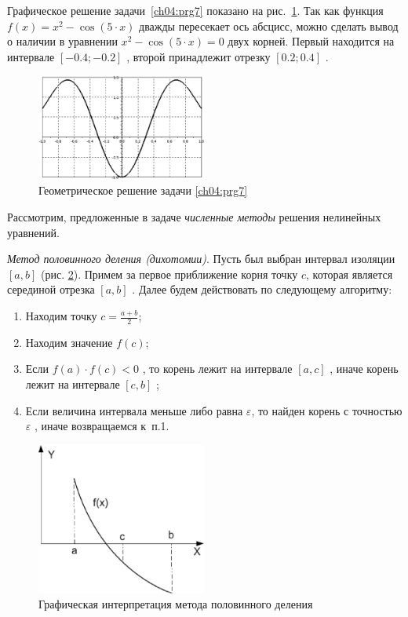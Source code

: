 Графическое решение задачи~\ref{ch04:prg7} показано на рис.~\ref{ch04:refDrawing1}. 
Так как функция  $f(x)=x^2-\cos (5\cdot x)$
 дважды пересекает ось абсцисс, можно сделать вывод о наличии  в уравнении  $x^2-\cos (5\cdot x)=0$  двух корней.
Первый находится на интервале  $[-0.4;-0.2]$ , второй принадлежит отрезку  $[0.2;0.4]$ .

\begin{figure}[htb]
\begin{center}
\includegraphics[width=0.5\textwidth]{img/ris_4_2}
\caption{Геометрическое решение задачи \ref{ch04:prg7}}
\label{ch04:refDrawing1}
\end{center}
\end{figure}

Рассмотрим, предложенные в задаче \emph{численные методы }решения нелинейных уравнений.

\emph{Метод половинного деления (дихотомии)}. Пусть был выбран интервал изоляции  $[a,b]$  (рис.
\ref{ch04:refDrawing2}). Примем за первое приближение корня точку $c$, которая является серединой отрезка 
$[a,b]$ . Далее будем действовать по следующему алгоритму:
\begin{enumerate}
\item Находим точку  $c=\frac{a+b}{2}$;
\item Находим значение  $f(c)$;
\item Если  $f(a)\cdot f(c)<0$ , то корень лежит на интервале  $[a,c]$ , иначе корень лежит на интервале  $[c,b]$ ;
\item Если величина интервала меньше либо равна  $\varepsilon$, то найден корень с точностью  $\varepsilon$ , иначе
возвращаемся к~п.1.
\end{enumerate}

\begin{figure}[htb]
\begin{center}
\includegraphics[width=0.5\textwidth]{img/ris_4_3}
\caption{Графическая интерпретация метода половинного деления}
\label{ch04:refDrawing2}
\end{center}
\end{figure}

